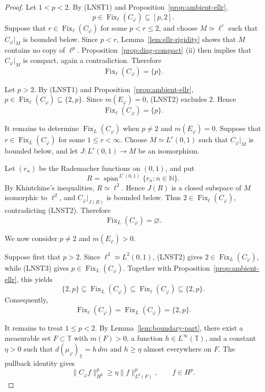 \documentclass[11pt, reqno]{amsart}
\theoremstyle{definition}
\theoremstyle{remark}
\newcommand{\T}{\mathbb{T}}
\begin{document}
\begin{proof}
Let \(1<p<2\). By \textup{(LNST1)} and
Proposition~\ref{prop:ambient-ellr},
\[
        p
        \in
        \operatorname{Fix}_{\ell}(C_\varphi)
        \subseteq
        [p,2].
\]
Suppose that
\(r\in\operatorname{Fix}_{\ell}(C_\varphi)\) for some \(p<r\le2\),
and choose \(M\simeq\ell^r\) such that \(C_\varphi|_M\) is bounded
below. Since \(p<r\),
Lemma~\ref{lem:ellr-rigidity} shows that \(M\) contains no
copy of \(\ell^p\).
Proposition~\ref{prop:diag-compact}%
\textup{(ii)} then implies that \(C_\varphi|_M\) is compact, again a
contradiction. Therefore
\[
        \operatorname{Fix}_{\ell}(C_\varphi)=\{p\}.
\]

Let \(p>2\). By \textup{(LNST1)} and
Proposition~\ref{prop:ambient-ellr},
\(p\in\operatorname{Fix}_{\ell}(C_\varphi)\subseteq\{2,p\}\).
Since \(m(E_\varphi)=0\), \textup{(LNST2)} excludes \(2\). Hence
\[
        \operatorname{Fix}_{\ell}(C_\varphi)=\{p\}.
\]

It remains to determine
\(\operatorname{Fix}_{L}(C_\varphi)\) when \(p\ne2\) and
\(m(E_\varphi)=0\). Suppose that
\(r\in\operatorname{Fix}_{L}(C_\varphi)\) for some
\(1\le r<\infty\). Choose \(M\simeq L^r(0,1)\) such that
\(C_\varphi|_M\) is bounded below, and let
\(J:L^r(0,1)\to M\) be an isomorphism.

Let \((r_n)\) be the Rademacher functions on \((0,1)\), and put
\[
        R
        =
        \overline{\operatorname{span}}^{\,L^r(0,1)}
        \{r_n:n\in\mathbb N\}.
\]
By Khintchine's inequalities, \(R\simeq\ell^2\). Hence \(J(R)\)
is a closed subspace of \(M\) isomorphic to \(\ell^2\), and
\(C_\varphi|_{J(R)}\) is bounded below. Thus
\(2\in\operatorname{Fix}_{\ell}(C_\varphi)\), contradicting
\textup{(LNST2)}. Therefore
\[
        \operatorname{Fix}_{L}(C_\varphi)=\varnothing.
\]

We now consider \(p\ne2\) and \(m(E_\varphi)>0\).

Suppose first that \(p>2\). Since
\(\ell^2\simeq L^2(0,1)\), \textup{(LNST2)} gives
\(2\in\operatorname{Fix}_{L}(C_\varphi)\), while
\textup{(LNST3)} gives
\(p\in\operatorname{Fix}_{L}(C_\varphi)\). Together with
Proposition~\ref{prop:ambient-ellr}, this yields
\[
        \{2,p\}
        \subseteq
        \operatorname{Fix}_{L}(C_\varphi)
        \subseteq
        \operatorname{Fix}_{\ell}(C_\varphi)
        \subseteq
        \{2,p\}.
\]
Consequently,
\[
        \operatorname{Fix}_{\ell}(C_\varphi)
        =
        \operatorname{Fix}_{L}(C_\varphi)
        =
        \{2,p\}.
\]

It remains to treat \(1\le p<2\). By
Lemma~\ref{lem:boundary-part}, there exist a measurable set
\(F\subset\T\) with \(m(F)>0\), a function
\(h\in L^\infty(\T)\), and a constant \(\eta>0\) such that
\(d(\mu_\varphi)_\T=h\,dm\) and \(h\ge\eta\) almost everywhere on
\(F\). The pullback identity gives
\begin{equation}
\label{eq:diag-lower}
        \|C_\varphi f\|_{H^p}^p
        \ge
        \eta\|f\|_{L^p(F)}^p,
        \qquad
        f\in H^p.
\end{equation}


\end{proof}
\end{document}
